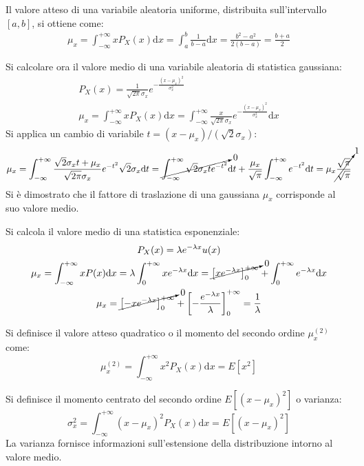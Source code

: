 \documentclass{article}
\newcommand{\df}{\mathrm{d}}
\numberwithin{equation}{subsection}
\begin{document}
Il valore atteso di una variabile aleatoria uniforme, distribuita sull'intervallo $[a,b]$, si ottiene come:
\begin{gather*}
    \mu_x=\displaystyle\int_{-\infty}^{+\infty}xP_X(x)\df x=\int_{a}^b\frac{1}{b-a}\df x=\frac{b^2-a^2}{2(b-a)}=\frac{b+a}{2}
\end{gather*}


Si calcolare ora il valore medio di una variabile aleatoria di statistica gaussiana:
\begin{gather*}
    P_X(x)=\displaystyle\frac{1}{\sqrt{2\pi}\sigma_x}e^{-\frac{(x-\mu_x)^2}{\sigma_x^2}}\\
    \mu_x=\displaystyle\int_{-\infty}^{+\infty}xP_X(x)\df x=\int_{-\infty}^{+\infty}\frac{x}{\sqrt{2\pi}\sigma_x}e^{-\frac{(x-\mu_x)^2}{\sigma_x^2}}\df x
\end{gather*}
Si applica un cambio di variabile $t=(x-\mu_x)/(\sqrt{2}\sigma_x)$:
\begin{gather*}
    \mu_x=\displaystyle\int_{-\infty}^{+\infty}\frac{\sqrt{2}\sigma_xt+\mu_x}{\sqrt{2\pi}\sigma_x}e^{-t^2}\sqrt{2}\sigma_x\df t=\cancelto{0}{\int_{-\infty}^{+\infty}\sqrt{2}\sigma_xte^{-t^2}}\df t+\frac{\mu_x}{\sqrt{\pi}}\int_{-\infty}^{+\infty}e^{-t^2}\df t=\mu_x\cancelto{1}{\frac{\sqrt{\pi}}{\sqrt{\pi}}}
\end{gather*}
Si è dimostrato che il fattore di traslazione di una gaussiana $\mu_x$ corrisponde al suo valore medio. 


Si calcola il valore medio di una statistica esponenziale:
\begin{gather*}
    P_X(x)=\lambda e^{-\lambda x}u(x)\\
    \mu_x=\displaystyle\int_{-\infty}^{+\infty}xP(x)\df x=\lambda\int_{0}^{+\infty}xe^{-\lambda x}\df x=\cancelto{0}{\left[xe^{-\lambda x}\right]_0^{+\infty}}+\int_0^{+\infty}e^{-\lambda x}\df x\\
    \mu_x=\displaystyle\cancelto{0}{\left[-xe^{-\lambda x}\right]_0^{+\infty}}+\left[-\frac{e^{-\lambda x}}{\lambda}\right]_0^{+\infty}=\frac{1}{\lambda}
\end{gather*}


Si definisce il valore atteso quadratico o il momento del secondo ordine $\mu_x^{(2)}$ come:
\begin{equation}
    \mu_x^{(2)}=\displaystyle\int_{-\infty}^{+\infty}x^2P_X(x)\df x=E[x^2]
\end{equation}

Si definisce il momento centrato del secondo ordine $E[(x-\mu_x)^2]$ o varianza:
\begin{equation}
    \sigma_x^2=\displaystyle\int_{-\infty}^{+\infty}(x-\mu_x)^2P_X(x)\df x=E[(x-\mu_x)^2]
\end{equation}
La varianza fornisce informazioni sull'estensione della distribuzione intorno al valore medio. 
\end{document}
